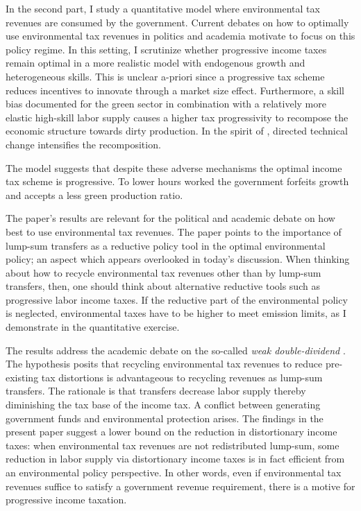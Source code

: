 In the second part, I study a quantitative model where environmental tax revenues are consumed by the government. Current debates on how to optimally use environmental tax revenues in politics \citep{Baker2017TheDividends} and academia \citep[e.g.][]{Fried2018TheGenerations, Carattini2018} motivate to focus on this policy regime. In this setting, I scrutinize whether progressive income taxes remain optimal in a more realistic model with endogenous growth and heterogeneous skills. This is unclear a-priori since a progressive tax scheme reduces incentives to innovate through a market size effect. Furthermore, a skill bias documented for the green sector \citep{Consoli2016DoCapital} in combination with a relatively more elastic high-skill labor supply causes a higher tax progressivity to recompose the economic structure towards dirty production. In the spirit of \cite{Acemoglu2002DirectedChange}, directed technical change intensifies the recomposition. %

 The model suggests that despite these adverse mechanisms the optimal income tax scheme is progressive. To lower hours worked the government forfeits growth and accepts a less green production ratio.  

The paper's results are relevant for the political and academic debate on how best to use environmental tax revenues. The paper points to the importance of lump-sum transfers as a reductive policy tool in the optimal environmental policy; an aspect which appears overlooked in today's discussion.%
When thinking about how to recycle environmental tax revenues other than by lump-sum transfers, then, one should think about alternative reductive tools such as progressive labor income taxes. 
If the reductive part of the environmental policy is neglected, environmental taxes have to be higher to meet emission limits, as I demonstrate in the quantitative exercise.

The results address the academic debate on the so-called \textit{weak double-dividend} \citep[for example:][]{LansBovenberg1994EnvironmentalTaxation, LansBovenberg1996OptimalAnalyses}. The hypothesis posits that recycling environmental tax revenues to reduce pre-existing tax distortions is advantageous to recycling  revenues as lump-sum transfers. The rationale is that transfers decrease labor supply thereby diminishing the tax base of the income tax. A conflict between generating government funds and environmental protection arises. The findings in the present paper suggest a lower bound on the reduction in distortionary income taxes: when environmental tax revenues are not redistributed lump-sum, some reduction in labor supply via distortionary income taxes is in fact efficient from an environmental policy perspective. In other words, even if environmental tax revenues suffice to satisfy a government revenue requirement, there is a motive for progressive income taxation. 

